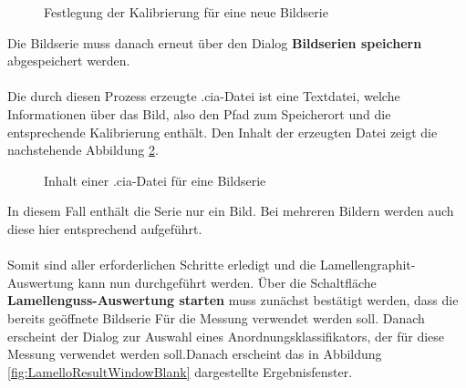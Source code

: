 \documentclass[
fontsize=10pt, 
listof = totoc,
parskip = half	
]{report}
\begin{document}
\begin{figure}[H]
	\centering
	\caption{Festlegung der Kalibrierung für eine neue Bildserie}
	\label{fig:ImgSetCalibration}
\end{figure}

\noindent Die Bildserie muss danach erneut über den Dialog \textbf{\glqq Bildserien speichern\grqq} abgespeichert werden.
\\\\
Die durch diesen Prozess erzeugte .cia-Datei ist eine Textdatei, welche Informationen über das Bild, also den Pfad zum Speicherort und die entsprechende Kalibrierung enthält. Den Inhalt der erzeugten Datei zeigt die nachstehende Abbildung \ref{fig:CiaContent}.

\begin{figure}[H]
	\centering
	\caption{Inhalt einer .cia-Datei für eine Bildserie}
	\label{fig:CiaContent}
\end{figure}

\noindent In diesem Fall enthält die Serie nur ein Bild. Bei mehreren Bildern werden auch diese hier entsprechend aufgeführt.
\\\\
Somit sind aller erforderlichen Schritte  erledigt und die Lamellengraphit-Auswertung kann nun durchgeführt werden. Über die Schaltfläche \textbf{\glqq Lamellenguss-Auswertung starten\grqq} muss zunächst bestätigt werden, dass die bereits geöffnete Bildserie Für die Messung verwendet werden soll. Danach erscheint der Dialog zur Auswahl eines Anordnungsklassifikators, der für diese Messung verwendet werden soll.Danach erscheint das in Abbildung \ref{fig:LamelloResultWindowBlank} dargestellte Ergebnisfenster.
\end{document}
